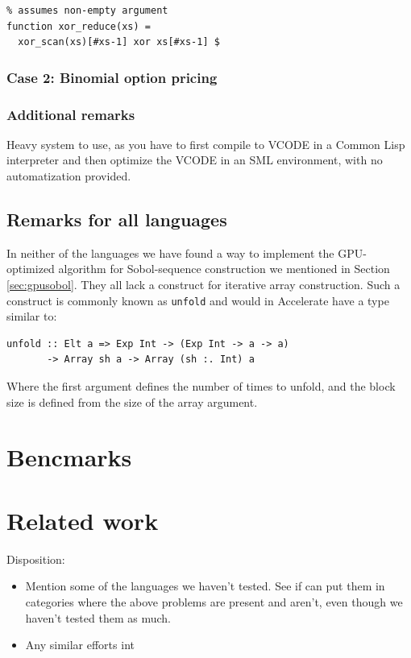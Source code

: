 \documentclass[preprint]{sigplanconf}
\begin{document}
\begin{verbatim}
% assumes non-empty argument
function xor_reduce(xs) = 
  xor_scan(xs)[#xs-1] xor xs[#xs-1] $
\end{verbatim}

\subsubsection{Case 2: Binomial option pricing}

\subsubsection{Additional remarks} Heavy system to use, as you have to
first compile to VCODE in a Common Lisp interpreter and then optimize
the VCODE in an SML environment, with no automatization provided.


\subsection{Remarks for all languages}

In neither of the languages we have found a way to implement the
GPU-optimized algorithm for Sobol-sequence construction we mentioned
in Section \ref{sec:gpusobol}. They all lack a construct for iterative
array construction. Such a construct is commonly known as
\texttt{unfold} and would in Accelerate have a type similar to:

\begin{verbatim}
unfold :: Elt a => Exp Int -> (Exp Int -> a -> a)
       -> Array sh a -> Array (sh :. Int) a
\end{verbatim}
Where the first argument defines the number of times to unfold, and
the block size is defined from the size of the array argument.


\section{Bencmarks}

\section{Related work}
Disposition:
\begin{itemize}
\item Mention some of the languages we haven't tested. See if can put
  them in categories where the above problems are present and aren't,
  even though we haven't tested them as much.
\item Any similar efforts int
\end{itemize}
\end{document}
